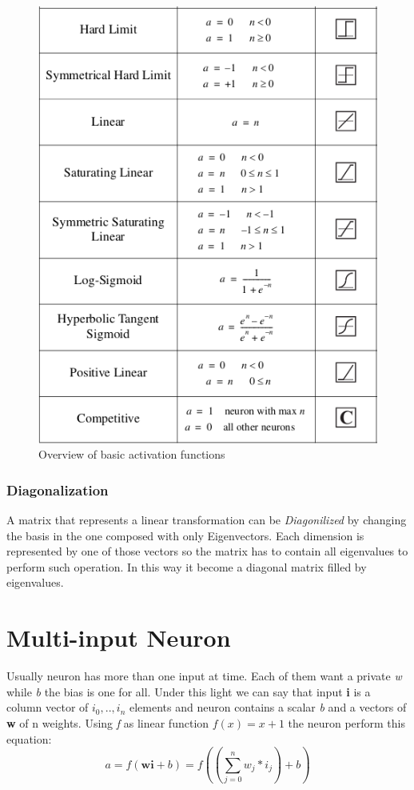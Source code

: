 \documentclass[12pt,a4paper,twoside,openright]{scrbook}
\begin{document}
\begin{figure}
    \centering
    \includegraphics[scale=0.65]{img/activation-functions-table.png}
    \caption{Overview of basic activation functions}
    \label{img:activation-functions-basic}
\end{figure}

\subsubsection{Diagonalization}

A matrix that represents a linear transformation can be \textit{Diagonilized} by changing the basis in the one composed with only Eigenvectors. Each dimension is represented by one of those vectors so the matrix has to contain all eigenvalues to perform such operation. In this way it become a diagonal matrix filled by eigenvalues. 

\section{Multi-input Neuron}
Usually neuron has more than one input at time. Each of them want a private \textit{w} while \textit{b} the bias is one for all. Under this light we can say that input \textbf{i} is a column vector of $i_0,.., i_n$ elements and neuron contains a scalar \textit{b} and a vectors of \textbf{w} of n weights. Using \textit{f} as linear function $f(x) =x + 1$ the neuron perform this equation:
\begin{equation}
a = f(\textbf{wi} + b) = f((\sum_{j=0}^{n} w_j * i_j) + b)
\end{equation}
\end{document}

